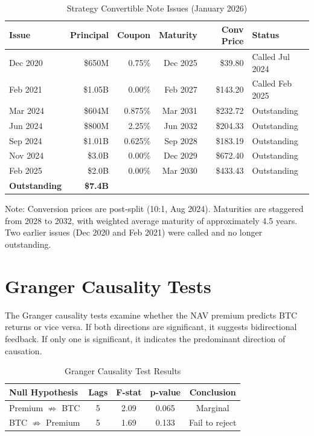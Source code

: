 \begin{table}[H]
\centering
\caption{Strategy Convertible Note Issues (January 2026)}
\begin{tabular}{@{}lrrrrl@{}}
\toprule
\textbf{Issue} & \textbf{Principal} & \textbf{Coupon} & \textbf{Maturity} & \textbf{Conv Price} & \textbf{Status} \\
\midrule
Dec 2020 & \$650M & 0.75\% & Dec 2025 & \$39.80 & Called Jul 2024 \\
Feb 2021 & \$1.05B & 0.00\% & Feb 2027 & \$143.20 & Called Feb 2025 \\
\midrule
Mar 2024 & \$604M & 0.875\% & Mar 2031 & \$232.72 & Outstanding \\
Jun 2024 & \$800M & 2.25\% & Jun 2032 & \$204.33 & Outstanding \\
Sep 2024 & \$1.01B & 0.625\% & Sep 2028 & \$183.19 & Outstanding \\
Nov 2024 & \$3.0B & 0.00\% & Dec 2029 & \$672.40 & Outstanding \\
Feb 2025 & \$2.0B & 0.00\% & Mar 2030 & \$433.43 & Outstanding \\
\midrule
\textbf{Outstanding} & \textbf{\$7.4B} & & & & \\
\bottomrule
\end{tabular}
\end{table}

Note: Conversion prices are post-split (10:1, Aug 2024). Maturities are staggered from 2028 to 2032, with weighted average maturity of approximately 4.5 years. Two earlier issues (Dec 2020 and Feb 2021) were called and no longer outstanding.

\section{Granger Causality Tests}
\label{app:granger}

The Granger causality tests examine whether the NAV premium predicts BTC returns or vice versa. If both directions are significant, it suggests bidirectional feedback. If only one is significant, it indicates the predominant direction of causation.

\begin{table}[H]
\centering
\caption{Granger Causality Test Results}
\begin{tabular}{@{}lcccc@{}}
\toprule
\textbf{Null Hypothesis} & \textbf{Lags} & \textbf{F-stat} & \textbf{p-value} & \textbf{Conclusion} \\
\midrule
Premium $\not\Rightarrow$ BTC & 5 & 2.09 & 0.065 & Marginal \\
BTC $\not\Rightarrow$ Premium & 5 & 1.69 & 0.133 & Fail to reject \\
\bottomrule
\end{tabular}
\end{table}


